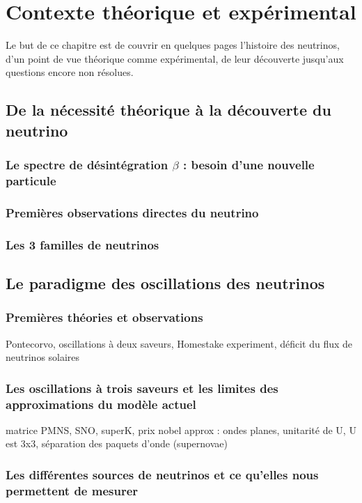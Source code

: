 \chapter{Contexte théorique et expérimental}
    
    Le but de ce chapitre est de couvrir en quelques pages l'histoire des neutrinos, d'un point de vue théorique comme expérimental, de leur découverte jusqu'aux questions encore non résolues.
    
    \section{De la nécessité théorique à la découverte du neutrino}
    
        \subsection{Le spectre de désintégration \texorpdfstring{$\beta$}{b} : besoin d'une nouvelle particule}
    
        \subsection{Premières observations directes du neutrino}
    
        \subsection{Les 3 familles de neutrinos}
    
    \section{Le paradigme des oscillations des neutrinos}
    
        \subsection{Premières théories et observations}
            Pontecorvo, oscillations à deux saveurs, Homestake experiment, déficit du flux de neutrinos solaires
        
        \subsection{Les oscillations à trois saveurs et les limites des approximations du modèle actuel}
            matrice PMNS, SNO, superK, prix nobel
            approx : ondes planes, unitarité de U, U est 3x3, séparation des paquets d'onde (supernovae)
        
        \subsection{Les différentes sources de neutrinos et ce qu'elles nous permettent de mesurer}
    
